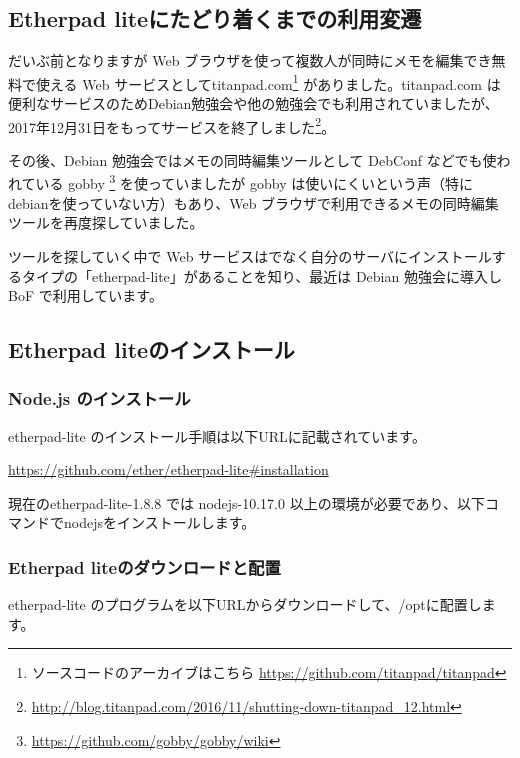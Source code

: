 \documentclass[mingoth,a4paper]{jsarticle}
\begin{document}
\subsection{Etherpad liteにたどり着くまでの利用変遷}

だいぶ前となりますが Web ブラウザを使って複数人が同時にメモを編集でき無料で使える Web サービスとしてtitanpad.com\footnote{ソースコードのアーカイブはこちら \url{https://github.com/titanpad/titanpad}} がありました。titanpad.com は便利なサービスのためDebian勉強会や他の勉強会でも利用されていましたが、2017年12月31日をもってサービスを終了しました\footnote{\url{http://blog.titanpad.com/2016/11/shutting-down-titanpad_12.html}}。

その後、Debian 勉強会ではメモの同時編集ツールとして DebConf などでも使われている gobby \footnote{\url{https://github.com/gobby/gobby/wiki}} を使っていましたが gobby は使いにくいという声（特にdebianを使っていない方）もあり、Web ブラウザで利用できるメモの同時編集ツールを再度探していました。

ツールを探していく中で Web サービスはでなく自分のサーバにインストールするタイプの「etherpad-lite」があることを知り、最近は Debian 勉強会に導入し BoF で利用しています。

\subsection{Etherpad liteのインストール}

\subsubsection{Node.js のインストール}

etherpad-lite のインストール手順は以下URLに記載されています。

\url{https://github.com/ether/etherpad-lite#installation}

現在のetherpad-lite-1.8.8 では nodejs-10.17.0 以上の環境が必要であり、以下コマンドでnodejsをインストールします。


\subsubsection{Etherpad liteのダウンロードと配置}

etherpad-lite のプログラムを以下URLからダウンロードして、/optに配置します。
\end{document}
